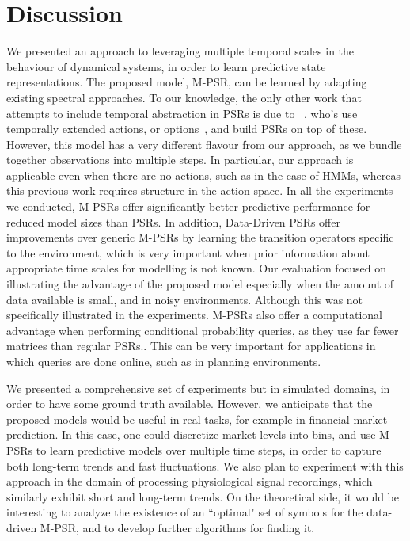 \section{Discussion}

We presented an approach to leveraging multiple temporal scales in the behaviour of dynamical systems, in order to learn predictive state representations.  The proposed model, M-PSR, can be learned by adapting existing spectral approaches.  To our knowledge, the only other work that attempts to include temporal abstraction in PSRs is due to ~\cite{wolfe06}, who's use temporally extended actions, or options~\cite{sutton99}, and build PSRs on top of these.  However, this model has a very different flavour from our approach, as we bundle together observations into multiple steps.  In particular, our approach is applicable even when there are no actions, such as in the case of HMMs, whereas this previous work requires structure in the action space.
In all the experiments we conducted, M-PSRs offer significantly better predictive performance for reduced model sizes than PSRs. In addition, Data-Driven PSRs offer improvements over generic M-PSRs by learning the transition operators specific to the environment, which is very important when prior information about appropriate time scales for modelling is not known.  Our evaluation focused on illustrating the advantage of the proposed model especially when the amount of data available is small, and in noisy environments.
 Although this was not specifically illustrated in the experiments. M-PSRs also offer a computational advantage when performing conditional probability queries, as they use far fewer matrices than regular PSRs.. This can be very important for applications in which queries are done online, such as in planning environments. 
 
 We presented a comprehensive set of experiments but in simulated domains, in order to have some ground truth available.  However, we anticipate that the proposed models would be useful in real tasks, for example in financial market prediction.  In this case, one could discretize market levels into bins, and use M-PSRs to learn predictive models over multiple time steps, in order to capture both long-term trends and fast fluctuations.  We also plan to experiment with this approach in the domain of processing physiological signal recordings, which similarly exhibit short and long-term trends.  On the theoretical side, it would be interesting to analyze the existence of an ``optimal" set of symbols for the data-driven M-PSR, and to develop further algorithms for finding it.

